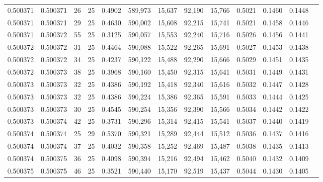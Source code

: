 \begin{tabular}{rrrrrrrrrrrrr}
0.500371 & 0.500371 &    26 &  25 &                                     0.4902 & 589,973 &  15,637 &  92,190 &  15,766 & 0.5021 & 0.1460 & 0.1448 \\
0.500371 & 0.500371 &    29 &  25 &                                     0.4630 & 590,002 &  15,608 &  92,215 &  15,741 & 0.5021 & 0.1458 & 0.1446 \\
0.500371 & 0.500372 &    55 &  25 &                                     0.3125 & 590,057 &  15,553 &  92,240 &  15,716 & 0.5026 & 0.1456 & 0.1441 \\
0.500372 & 0.500372 &    31 &  25 &                                     0.4464 & 590,088 &  15,522 &  92,265 &  15,691 & 0.5027 & 0.1453 & 0.1438 \\
0.500372 & 0.500372 &    34 &  25 &                                     0.4237 & 590,122 &  15,488 &  92,290 &  15,666 & 0.5029 & 0.1451 & 0.1435 \\
0.500372 & 0.500373 &    38 &  25 &                                     0.3968 & 590,160 &  15,450 &  92,315 &  15,641 & 0.5031 & 0.1449 & 0.1431 \\
0.500373 & 0.500373 &    32 &  25 &                                     0.4386 & 590,192 &  15,418 &  92,340 &  15,616 & 0.5032 & 0.1447 & 0.1428 \\
0.500373 & 0.500373 &    32 &  25 &                                     0.4386 & 590,224 &  15,386 &  92,365 &  15,591 & 0.5033 & 0.1444 & 0.1425 \\
0.500373 & 0.500373 &    30 &  25 &                                     0.4545 & 590,254 &  15,356 &  92,390 &  15,566 & 0.5034 & 0.1442 & 0.1422 \\
0.500373 & 0.500374 &    42 &  25 &                                     0.3731 & 590,296 &  15,314 &  92,415 &  15,541 & 0.5037 & 0.1440 & 0.1419 \\
0.500374 & 0.500374 &    25 &  29 &                                     0.5370 & 590,321 &  15,289 &  92,444 &  15,512 & 0.5036 & 0.1437 & 0.1416 \\
0.500374 & 0.500374 &    37 &  25 &                                     0.4032 & 590,358 &  15,252 &  92,469 &  15,487 & 0.5038 & 0.1435 & 0.1413 \\
0.500374 & 0.500375 &    36 &  25 &                                     0.4098 & 590,394 &  15,216 &  92,494 &  15,462 & 0.5040 & 0.1432 & 0.1409 \\
0.500375 & 0.500375 &    46 &  25 &                                     0.3521 & 590,440 &  15,170 &  92,519 &  15,437 & 0.5044 & 0.1430 & 0.1405 \\

\end{tabular}
